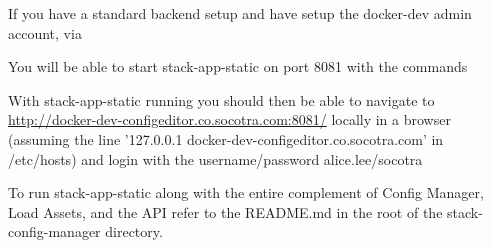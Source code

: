If you have a standard backend setup and have setup the docker-dev admin
account, via

\begin{Shaded}
\begin{Highlighting}[]
\end{Highlighting}
\end{Shaded}

You will be able to start stack-app-static on port 8081 with the
commands

\begin{Shaded}
\begin{Highlighting}[]
\end{Highlighting}
\end{Shaded}

With stack-app-static running you should then be able to navigate to
\href{http://docker-dev-configeditor.co.socotra.com:8081/}{http://docker-dev-configeditor.co.socotra.com:8081/}
locally in a browser (assuming the line '127.0.0.1
docker-dev-configeditor.co.socotra.com' in /etc/hosts) and login with
the username/password alice.lee/socotra

To run stack-app-static along with the entire complement of Config
Manager, Load Assets, and the API refer to the README.md in the root of
the stack-config-manager directory.
